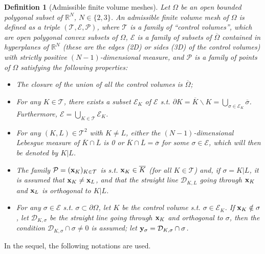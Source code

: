 \documentclass[oneside,11pt]{book}
\numberwithin{equation}{section}
\newtheorem{definition}{Definition}[section]
\begin{document}
\begin{definition}[Admissible finite volume meshes]
    \label{def: admissible FV mesh}
    Let $\Omega$ be an open bounded polygonal subset of $\mathbb{R}^N$, $N\in\{2,3\}$. An \emph{admissible finite volume mesh} of $\Omega$ is defined as a triple $(\mathcal{T},\mathcal{E},\mathcal{P})$, where $\mathcal{T}$ is a family of ``control volumes'', which are open polygonal convex subsets of $\Omega$, $\mathcal{E}$ is a family of subsets of $\overline{\Omega}$ contained in hyperplanes of $\mathbb{R}^N$ (these are the edges (2D) or sides (3D) of the control volumes) with strictly positive $(N - 1)$-dimensional measure, and $\mathcal{P}$ is a family of points of $\Omega$ satisfying the following properties:
    \begin{itemize}
        \item[(i)] The closure of the union of all the control volumes is $\overline{\Omega}$;
        \item[(ii)] For any $K\in\mathcal{T}$, there exists a subset $\mathcal{E}_K$ of $\mathcal{E}$ s.t. $\partial K = \overline{K}\backslash K = \bigcup_{\sigma\in\mathcal{E}_K} \overline{\sigma}$. Furthermore, $\mathcal{E} = \bigcup_{K\in\mathcal{T}} \mathcal{E}_K$.
        \item[(iii)] For any $(K,L)\in\mathcal{T}^2$ with $K\ne L$, either the $(N - 1)$-dimensional Lebesgue measure of $\overline{K}\cap\overline{L}$ is 0 or $\overline{K}\cap\overline{L} = \overline{\sigma}$ for some $\sigma\in\mathcal{E}$, which will then be denoted by $K|L$.
        \item[(iv)] The family $\mathcal{P} = ({\bf x}_K)_{K\in\mathcal{T}}$ is s.t. ${\bf x}_K\in\overline{K}$ (for all $K\in\mathcal{T}$) and, if $\sigma = K|L$, it is assumed that ${\bf x}_K\ne{\bf x}_L$, and that the straight line $\mathcal{D}_{K,L}$ going through ${\bf x}_K$ and ${\bf x}_L$ is orthogonal to $K|L$.
        \item[(v)] For any $\sigma\in\mathcal{E}$ s.t. $\sigma\subset\partial\Omega$, let $K$ be the control volume s.t. $\sigma\in\mathcal{E}_K$. If ${\bf x}_K\notin\sigma$, let $\mathcal{D}_{K,\sigma}$ be the straight line going through ${\bf x}_K$ and orthogonal to $\sigma$, then the condition $\mathcal{D}_{K,\sigma}\cap\sigma\ne 0$ is assumed; let ${\bf y}_\sigma = \mathcal{D}_{K,\sigma}\cap\sigma$.
    \end{itemize}
\end{definition}
In the sequel, the following notations are used.
\end{document}
